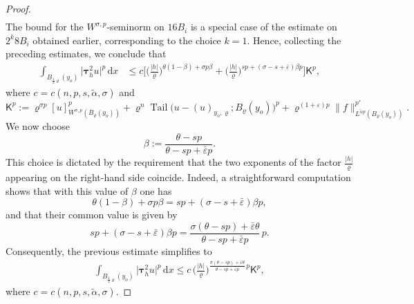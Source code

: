 \documentclass[10pt,letterpaper]{amsart}
\theoremstyle{definition}
\numberwithin{theorem}{section}
\numberwithin{equation}{section}
\newcommand{\1}{\ensuremath{\mathds{1}}}
\newcommand{\dx}{\mathrm{d}x}
\newcommand\sfK{{\boldsymbol{\mathsf K}}}
\renewcommand{\epsilon}{\varepsilon}
\renewcommand{\rho}{\varrho}
\renewcommand{\epsilon}{\varepsilon}
\renewcommand{\rho}{\varrho}
\DeclareMathOperator{\Tail}{Tail}
\numberwithin{equation}{section}
\begin{document}
\begin{proof}
\begin{align*}
\end{align*}
The bound for the \(W^{\sigma,p}\)-seminorm on \(16B_i\) is a special case
of the estimate on \(2^k 8B_i\) obtained earlier, corresponding to the
choice \(k=1\). Hence, collecting the preceding estimates, we conclude that
\begin{align*}
    \int_{B_{\frac12 \rho}(y_o)} \big|\boldsymbol\tau_h^2 u\big|^p \,\dx
    &\le
    c \bigg[ \Big(\frac{|h|}{\rho}\Big)^{\theta(1-\beta)+\sigma p\beta} + \Big(\frac{|h|}{\rho}\Big)^{sp + (\sigma-s+\bar\varepsilon)\beta p} \bigg] \sfK^p,
\end{align*}
where $c=c(n,p,s,\tilde\alpha,\sigma)$ and 
\begin{equation*}
    \sfK^p
    :=
    \rho^{\sigma p}[u]_{W^{\sigma,p}(B_{\rho}(y_o))}^p + 
    \rho^{n}\Tail\big(u-(u)_{y_o,\rho};B_\rho(y_o)\big)^p + \rho^{(1+\epsilon) p}\|f\|_{L^{\tilde\alpha p}(B_\rho(y_o))}^{p'}.
\end{equation*}
We now choose
\[
    \beta 
    :=
    \frac{\theta-sp}{\theta-sp+\bar\epsilon p}.
\]
This choice is dictated by the requirement that the two exponents of the factor
\(\frac{|h|}{\rho}\) appearing on the right-hand side coincide. Indeed, a
straightforward computation shows that with this value of \(\beta\) one has
\[
    \theta(1-\beta)+\sigma p\beta
    =
    sp+(\sigma-s+\bar\epsilon)\beta p,
\]
and that their common value is given by
\[
    sp+(\sigma-s+\bar\epsilon)\beta p
    =
    \frac{\sigma(\theta-sp)+\bar\epsilon\theta}{\theta-sp+\bar\epsilon p}\, p.
\]
Consequently, the previous estimate simplifies to
\begin{align}\label{sstep1}
    \int_{B_{\frac12 \rho}(y_o)} \big|\boldsymbol\tau_h^2 u\big|^p \,\dx
    \le
    c\, \Big(\frac{|h|}{\rho}\Big)^{\frac{\sigma(\theta-sp)+\bar\epsilon\theta}{\theta-sp+\bar\epsilon p}\, p}
    \sfK^p,
\end{align}
where \(c=c(n,p,s,\tilde\alpha,\sigma)\).



\smallskip


\end{proof}
\end{document}
